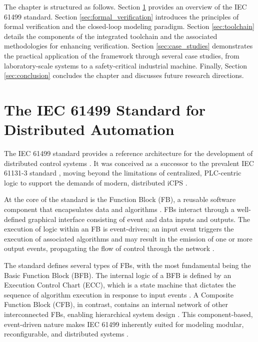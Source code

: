 The chapter is structured as follows. Section \ref{sec:iec61499} provides an overview of the IEC 61499 standard. Section \ref{sec:formal_verification} introduces the principles of formal verification and the closed-loop modeling paradigm. Section \ref{sec:toolchain} details the components of the integrated toolchain and the associated methodologies for enhancing verification. Section \ref{sec:case_studies} demonstrates the practical application of the framework through several case studies, from laboratory-scale systems to a safety-critical industrial machine. Finally, Section \ref{sec:conclusion} concludes the chapter and discusses future research directions.

\section{The IEC 61499 Standard for Distributed Automation}\label{sec:iec61499}

The IEC 61499 standard provides a reference architecture for the development of distributed control systems \cite{iec61499}. It was conceived as a successor to the prevalent IEC 61131-3 standard \cite{tiegelkamp1995iec}, moving beyond the limitations of centralized, PLC-centric logic to support the demands of modern, distributed iCPS \cite{zoitl2014}.

At the core of the standard is the Function Block (FB), a reusable software component that encapsulates data and algorithms \cite{drozdov2021}. FBs interact through a well-defined graphical interface consisting of event and data inputs and outputs. The execution of logic within an FB is event-driven; an input event triggers the execution of associated algorithms and may result in the emission of one or more output events, propagating the flow of control through the network \cite{christensen2000design}.

The standard defines several types of FBs, with the most fundamental being the Basic Function Block (BFB). The internal logic of a BFB is defined by an Execution Control Chart (ECC), which is a state machine that dictates the sequence of algorithm execution in response to input events \cite{hanisch2009one}. A Composite Function Block (CFB), in contrast, contains an internal network of other interconnected FBs, enabling hierarchical system design \cite{sonnleithner2021iec}. This component-based, event-driven nature makes IEC 61499 inherently suited for modeling modular, reconfigurable, and distributed systems \cite{patil2018}.

